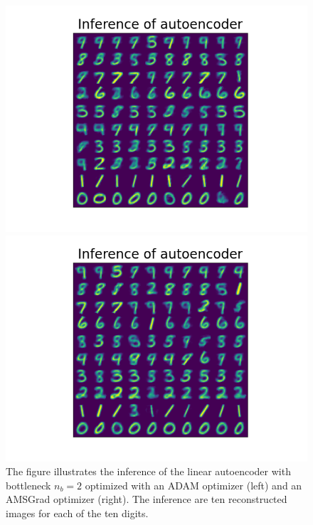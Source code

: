 \begin{figure}
\begin{center}
   \begin{minipage}[b]{0.49\linewidth}
      \includegraphics[width=\linewidth]{linear_AE_2d_adam_inference}
	\end{minipage}
   \begin{minipage}[b]{0.49\linewidth}
      \includegraphics[width=\linewidth]{linear_AE_2d_amsgrad_inference}
	\end{minipage}
\end{center}
\caption{The figure illustrates the inference of the linear autoencoder with bottleneck $n_b=2$ optimized with an ADAM optimizer (left) and an AMSGrad optimizer (right). The inference are ten reconstructed images for each of the ten digits.}\label{fig:linear_AE_2d_inference}
\end{figure}


